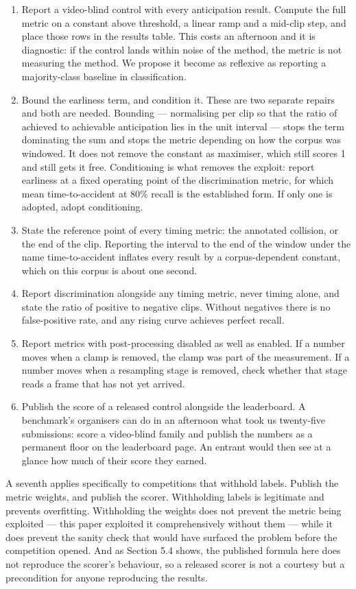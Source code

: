 \begin{enumerate}
\item
  Report a video-blind control with every anticipation result. Compute the full metric on a constant above threshold, a linear ramp and a mid-clip step, and place those rows in the results table. This costs an afternoon and it is diagnostic: if the control lands within noise of the method, the metric is not measuring the method. We propose it become as reflexive as reporting a majority-class baseline in classification.
\item
  Bound the earliness term, and condition it. These are two separate repairs and both are needed. Bounding --- normalising per clip so that the ratio of achieved to achievable anticipation lies in the unit interval --- stops the term dominating the sum and stops the metric depending on how the corpus was windowed. It does not remove the constant as maximiser, which still scores 1 and still gets it free. Conditioning is what removes the exploit: report earliness at a fixed operating point of the discrimination metric, for which mean time-to-accident at 80\% recall is the established form. If only one is adopted, adopt conditioning.
\item
  State the reference point of every timing metric: the annotated collision, or the end of the clip. Reporting the interval to the end of the window under the name time-to-accident inflates every result by a corpus-dependent constant, which on this corpus is about one second.
\item
  Report discrimination alongside any timing metric, never timing alone, and state the ratio of positive to negative clips. Without negatives there is no false-positive rate, and any rising curve achieves perfect recall.
\item
  Report metrics with post-processing disabled as well as enabled. If a number moves when a clamp is removed, the clamp was part of the measurement. If a number moves when a resampling stage is removed, check whether that stage reads a frame that has not yet arrived.
\item
  Publish the score of a released control alongside the leaderboard. A benchmark's organisers can do in an afternoon what took us twenty-five submissions: score a video-blind family and publish the numbers as a permanent floor on the leaderboard page. An entrant would then see at a glance how much of their score they earned.
\end{enumerate}

A seventh applies specifically to competitions that withhold labels. Publish the metric weights, and publish the scorer. Withholding labels is legitimate and prevents overfitting. Withholding the weights does not prevent the metric being exploited --- this paper exploited it comprehensively without them --- while it does prevent the sanity check that would have surfaced the problem before the competition opened. And as Section 5.4 shows, the published formula here does not reproduce the scorer's behaviour, so a released scorer is not a courtesy but a precondition for anyone reproducing the results.


